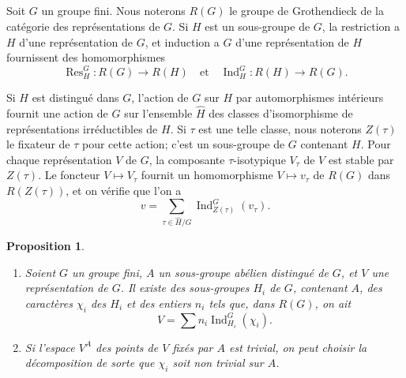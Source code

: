 \documentclass[12pt,a4paper]{article}
\theoremstyle{plain}
\newtheorem{proposition}[theorem]{Proposition}
\theoremstyle{definition}
\theoremstyle{remark}
\DeclareMathOperator{\Ind}{Ind}
\DeclareMathOperator{\Res}{Res}
\begin{document}
\subsection{}
\label{sec:2.1}

Soit $G$ un groupe fini. Nous noterons $R(G)$ le groupe de Grothendieck de la cat\'egorie des repr\'esentations de $G$. Si $H$ est un sous-groupe de $G$, la restriction a $H$ d'une repr\'esentation de $G$, et induction a $G$ d'une repr\'esentation de $H$ fournissent des homomorphismes
\[
\Res_H^G: R(G) \to R(H) \quad \text{et} \quad \Ind_H^G: R(H) \to R(G).
\]

Si $H$ est distingu\'e dans $G$, l'action de $G$ sur $H$ par automorphismes int\'erieurs fournit une action de $G$ sur l'ensemble $\hat{H}$ des classes d'isomorphisme de repr\'esentations irr\'eductibles de $H$. Si $\tau$ est une telle classe, nous noterons $Z(\tau)$ le fixateur de $\tau$ pour cette action; c'est un sous-groupe de $G$ contenant $H$. Pour chaque repr\'esentation $V$ de $G$, la composante $\tau$-isotypique $V_\tau$ de $V$ est stable par $Z(\tau)$. Le foncteur $V \mapsto V_\tau$ fournit un homomorphisme $V \mapsto v_\tau$ de $R(G)$ dans $R(Z(\tau))$, et on v\'erifie que l'on a
\begin{equation}\label{eq:2.1.1}
v = \sum_{\tau \in \hat{H}/G} \Ind_{Z(\tau)}^G(v_\tau).
\end{equation}

\begin{proposition}\label{prop:2.2}
\begin{enumerate}[label=(\roman*)]
\item Soient $G$ un groupe fini, $A$ un sous-groupe ab\'elien distingu\'e de $G$, et $V$ une repr\'esentation de $G$. Il existe des sous-groupes $H_i$ de $G$, contenant $A$, des caract\`eres $\chi_i$ des $H_i$ et des entiers $n_i$ tels que, dans $R(G)$, on ait
\[
V = \sum n_i \Ind_{H_i}^G(\chi_i).
\]
\item Si l'espace $V^A$ des points de $V$ fix\'es par $A$ est trivial, on peut choisir la d\'ecomposition de sorte que $\chi_i$ soit non trivial sur $A$.
\end{enumerate}
\end{proposition}
\end{document}
